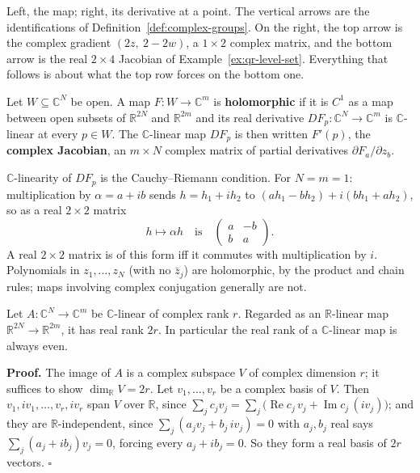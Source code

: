 \documentclass[11pt]{report}
\makeatletter
\newcounter{defcounter}[section]
\newcounter{thmcounter}[section]
\renewenvironment{proof}[1][Proof]{\noindent\textbf{#1.} }{\hfill$\square$\par\vspace{5pt}}
\newcommand{\thmlabel}[1]{\edef\@currentlabel{\arabic{section}.\arabic{thmcounter}}\label{#1}}
\newcommand{\deflabel}[1]{\edef\@currentlabel{\arabic{section}.\arabic{defcounter}}\label{#1}}
\makeatother
\begin{document}
Left, the map; right, its derivative at a point. The vertical arrows are the identifications of Definition~\ref{def:complex-groups}. On the right, the top arrow is the complex gradient $(2z,\ 2-2w)$, a $1 \times 2$ complex matrix, and the bottom arrow is the real $2 \times 4$ Jacobian of Example~\ref{ex:qr-level-set}. Everything that follows is about what the top row forces on the bottom one.

\begin{defbox}\deflabel{def:holomorphic}
Let $W \subseteq \mathbb{C}^N$ be open. A map $F : W \to \mathbb{C}^m$ is \textbf{holomorphic} if it is $C^1$ as a map between open subsets of $\mathbb{R}^{2N}$ and $\mathbb{R}^{2m}$ and its real derivative $DF_p : \mathbb{C}^N \to \mathbb{C}^m$ is $\mathbb{C}$-linear at every $p \in W$. The $\mathbb{C}$-linear map $DF_p$ is then written $F'(p)$, the \textbf{complex Jacobian}, an $m \times N$ complex matrix of partial derivatives $\partial F_a / \partial z_b$.
\end{defbox}

\begin{rembox}\label{rem:rvt-2}
$\mathbb{C}$-linearity of $DF_p$ is the Cauchy--Riemann condition. For $N = m = 1$: multiplication by $\alpha = a + ib$ sends $h = h_1 + i h_2$ to $(a h_1 - b h_2) + i(b h_1 + a h_2)$, so as a real $2 \times 2$ matrix
\[
h \mapsto \alpha h \quad\text{is}\quad \begin{pmatrix} a & -b \\ b & a \end{pmatrix}.
\]
A real $2 \times 2$ matrix is of this form iff it commutes with multiplication by $i$. Polynomials in $z_1, \ldots, z_N$ (with no $\bar z_j$) are holomorphic, by the product and chain rules; maps involving complex conjugation generally are not.
\end{rembox}

\begin{lembox}\thmlabel{lem:real-rank-complex}
Let $A : \mathbb{C}^N \to \mathbb{C}^m$ be $\mathbb{C}$-linear of complex rank $r$. Regarded as an $\mathbb{R}$-linear map $\mathbb{R}^{2N} \to \mathbb{R}^{2m}$, it has real rank $2r$. In particular the real rank of a $\mathbb{C}$-linear map is always even.
\end{lembox}

\begin{proof}
The image of $A$ is a complex subspace $V$ of complex dimension $r$; it suffices to show $\dim_{\mathbb{R}} V = 2r$. Let $v_1, \ldots, v_r$ be a complex basis of $V$. Then $v_1, iv_1, \ldots, v_r, iv_r$ span $V$ over $\mathbb{R}$, since $\sum_j c_j v_j = \sum_j \big(\operatorname{Re} c_j\, v_j + \operatorname{Im} c_j\,(i v_j)\big)$; and they are $\mathbb{R}$-independent, since $\sum_j (a_j v_j + b_j\, i v_j) = 0$ with $a_j, b_j$ real says $\sum_j (a_j + i b_j) v_j = 0$, forcing every $a_j + i b_j = 0$. So they form a real basis of $2r$ vectors.
\end{proof}
\end{document}
